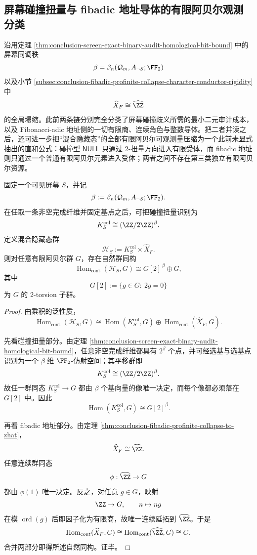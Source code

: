 \subsection{屏幕碰撞扭量与 fibadic 地址导体的有限阿贝尔观测分类}\label{subsec:conclusion-mixed-hiddenstate-finite-abelian-observability}
沿用定理 \ref{thm:conclusion-screen-exact-binary-audit-homological-bit-bound} 中的屏幕同调秩
\[
\beta=\beta_n(\mathcal Q_m,A_{\neg S};\FF_2)
\]
以及小节 \ref{subsec:conclusion-fibadic-profinite-collapse-character-conductor-rigidity} 中
\[
\widehat X_F\cong \widehat{\ZZ}
\]
的全局塌缩。此前两条链分别完全分类了屏幕碰撞歧义所需的最小二元审计成本，以及 Fibonacci-adic 地址侧的一切有限商、连续角色与整数导体。把二者并读之后，还可进一步把“混合隐藏态”的全部有限阿贝尔可观测量压缩为一个此前未显式抽出的直和公式：碰撞型 \(\mathsf{NULL}\) 只通过 \(2\)-扭量方向进入有限受体，而 fibadic 地址则只通过一个普通有限阿贝尔元素进入受体；两者之间不存在第三类独立有限阿贝尔资源。

\begin{theorem}[混合隐藏态的有限阿贝尔观测完全分类]\label{thm:conclusion-mixed-hidden-state-finite-abelian-classification}
固定一个可见屏幕 \(S\)，并记
\[
\beta:=\beta_n(\mathcal Q_m,A_{\neg S};\FF_2).
\]
在任取一条非空完成纤维并固定基点之后，可把碰撞扭量识别为
\[
K_S^{\mathrm{col}}\cong (\ZZ/2\ZZ)^\beta.
\]
定义混合隐藏态群
\[
\mathcal H_S:=K_S^{\mathrm{col}}\times \widehat X_F.
\]
则对任意有限阿贝尔群 \(G\)，存在自然群同构
\[
\operatorname{Hom}_{\mathrm{cont}}(\mathcal H_S,G)
\cong
G[2]^{\,\beta}\oplus G,
\]
其中
\[
G[2]:=\{g\in G:\ 2g=0\}
\]
为 \(G\) 的 \(2\)-torsion 子群。
\end{theorem}
\begin{proof}
由乘积的泛性质，
\[
\operatorname{Hom}_{\mathrm{cont}}(\mathcal H_S,G)
\cong
\operatorname{Hom}(K_S^{\mathrm{col}},G)\oplus
\operatorname{Hom}_{\mathrm{cont}}(\widehat X_F,G).
\]

先看碰撞扭量部分。由定理 \ref{thm:conclusion-screen-exact-binary-audit-homological-bit-bound}，任意非空完成纤维都具有 \(2^\beta\) 个点，并可经选基与选基点识别为一个 \(\beta\) 维 \(\FF_2\)-仿射空间；其平移群即
\[
K_S^{\mathrm{col}}\cong (\ZZ/2\ZZ)^\beta.
\]
故任一群同态 \(K_S^{\mathrm{col}}\to G\) 都由 \(\beta\) 个基向量的像唯一决定，而每个像都必须落在 \(G[2]\) 中。因此
\[
\operatorname{Hom}(K_S^{\mathrm{col}},G)\cong G[2]^\beta.
\]

再看 fibadic 地址部分。由定理 \ref{thm:conclusion-fibadic-profinite-collapse-to-zhat}，
\[
\widehat X_F\cong \widehat{\ZZ}.
\]
任意连续群同态
\[
\phi:\widehat{\ZZ}\to G
\]
都由 \(\phi(1)\) 唯一决定。反之，对任意 \(g\in G\)，映射
\[
\ZZ\to G,\qquad n\mapsto ng
\]
在模 \(\operatorname{ord}(g)\) 后即因子化为有限商，故唯一连续延拓到 \(\widehat{\ZZ}\)。于是
\[
\operatorname{Hom}_{\mathrm{cont}}(\widehat X_F,G)
\cong
\operatorname{Hom}_{\mathrm{cont}}(\widehat{\ZZ},G)
\cong
G.
\]
合并两部分即得所述自然同构。证毕。
\end{proof}

